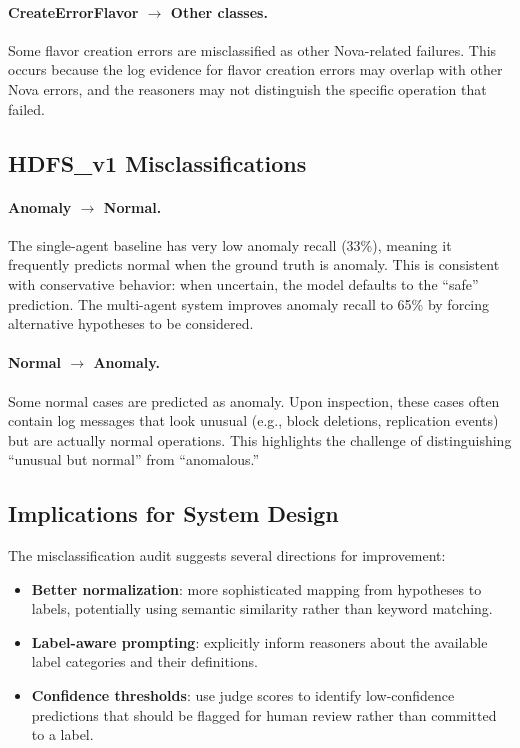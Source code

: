 \paragraph{CreateErrorFlavor $\rightarrow$ Other classes.}
Some flavor creation errors are misclassified as other Nova-related failures. This occurs because
the log evidence for flavor creation errors may overlap with other Nova errors, and the reasoners
may not distinguish the specific operation that failed.

\subsection{HDFS\_v1 Misclassifications}

\paragraph{Anomaly $\rightarrow$ Normal.}
The single-agent baseline has very low anomaly recall (33\%), meaning it frequently predicts normal
when the ground truth is anomaly. This is consistent with conservative behavior: when uncertain,
the model defaults to the ``safe'' prediction. The multi-agent system improves anomaly recall to
65\% by forcing alternative hypotheses to be considered.

\paragraph{Normal $\rightarrow$ Anomaly.}
Some normal cases are predicted as anomaly. Upon inspection, these cases often contain log messages
that look unusual (e.g., block deletions, replication events) but are actually normal operations.
This highlights the challenge of distinguishing ``unusual but normal'' from ``anomalous.''

\subsection{Implications for System Design}
The misclassification audit suggests several directions for improvement:
\begin{itemize}
  \item \textbf{Better normalization}: more sophisticated mapping from hypotheses to labels,
        potentially using semantic similarity rather than keyword matching.
  \item \textbf{Label-aware prompting}: explicitly inform reasoners about the available label
        categories and their definitions.
  \item \textbf{Confidence thresholds}: use judge scores to identify low-confidence predictions
        that should be flagged for human review rather than committed to a label.
\end{itemize}

